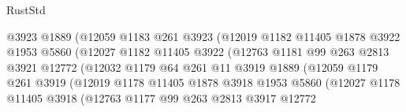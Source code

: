 \begin{lexlean}{RustStd}
\begin{coremodule}
                                  @3923
                                  @1889
                                  (@12059
                                    @1183
                                    @261
                                    @3923
                                    (@12019
                                      @1182
                                      @11405
                                      @1878
                                      @3922
                                      @1953
                                      @5860
                                      (@12027
                                        @1182
                                        @11405
                                        @3922
                                        (@12763
                                          @1181
                                          @99
                                          @263
                                          @2813
                                          @3921
                                          @12772
                                          (@12032
                                            @1179
                                            @64
                                            @261
                                            @11
                                            @3919
                                            @1889
                                            (@12059
                                              @1179
                                              @261
                                              @3919
                                              (@12019
                                                @1178
                                                @11405
                                                @1878
                                                @3918
                                                @1953
                                                @5860
                                                (@12027
                                                  @1178
                                                  @11405
                                                  @3918
                                                  (@12763
                                                    @1177
                                                    @99
                                                    @263
                                                    @2813
                                                    @3917
                                                    @12772

\end{coremodule}
\end{lexlean}
